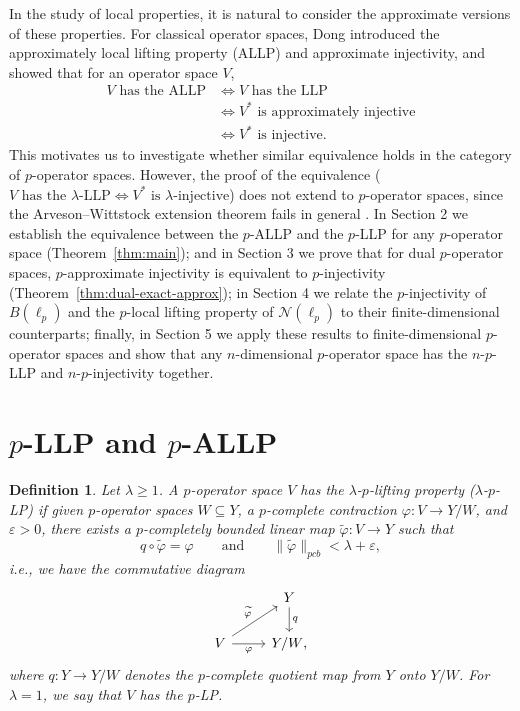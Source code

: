 \documentclass[12pt]{article}
\newtheorem{definition}[theorem]{Definition}
\newcommand{\pcb}{pcb}
\begin{document}
In the study of local properties, it is natural to consider the approximate versions of these properties. For classical operator spaces, Dong \cite{Dong2007} introduced the approximately local lifting property (ALLP) and approximate injectivity, and showed that for an operator space $V$,
\[
\begin{aligned}
V\text{ has the ALLP} &\Longleftrightarrow V\text{ has the LLP} \\
&\Longleftrightarrow V^*\text{ is approximately injective} \\
&\Longleftrightarrow V^*\text{ is injective}.
\end{aligned}
\]
This motivates us to investigate whether similar equivalence holds in the category of $p$-operator spaces. However, the proof of the equivalence ($V\text{ has the } \lambda\text{-LLP} \Longleftrightarrow V^*\text{ is } \lambda \text{-injective}$) does not extend to $p$-operator spaces, since the Arveson--Wittstock extension theorem fails in general \cite{Lee2015}. 
In Section 2  we establish the equivalence between the $p$-ALLP and the $p$-LLP for any $p$-operator space (Theorem~\ref{thm:main}); and in Section 3 we prove that for dual $p$-operator spaces, $p$-approximate injectivity is equivalent to $p$-injectivity (Theorem~\ref{thm:dual-exact-approx});  in Section 4 we relate the $p$-injectivity of $B(\ell_p)$ and the $p$-local lifting property of $\mathcal{N}(\ell_p)$ to their finite-dimensional counterparts; finally, in Section 5 we apply these results to finite-dimensional $p$-operator spaces and show that any $n$-dimensional $p$-operator space has the $n$-$p$-LLP and $n$-$p$-injectivity together.

\section{$p$-LLP and $p$-ALLP}

\begin{definition}\label{def:lambda-p-lp}
Let $\lambda\geq 1$.  A $p$-operator space $V$ has the
\emph{$\lambda$-$p$-lifting property} ($\lambda$-$p$-LP) if given $p$-operator spaces $W\subseteq Y$, a $p$-complete contraction
$\varphi:V\to Y/W$, and $\varepsilon>0$, there exists a $p$-completely bounded
linear map $\widetilde{\varphi}:V\to Y$ such that
\[
        q\circ\widetilde{\varphi}=\varphi
        \qquad\text{and}\qquad
        \|\widetilde{\varphi}\|_{\pcb}<\lambda+\varepsilon,
\]
i.e., we have the commutative diagram
\begin{equation*}
\begin{tikzcd}
& Y \arrow{d}{q} \\
V \arrow{r}[swap]{\varphi} \arrow{ru}{\widetilde{\varphi}} & Y/W\text{,}
\end{tikzcd}
\end{equation*}
where $q:Y\to Y/W$ denotes the
$p$-complete quotient map from $Y$ onto $Y/W$.
For $\lambda=1$, we say that $V$ has the $p$-LP.
\end{definition}
\end{document}
